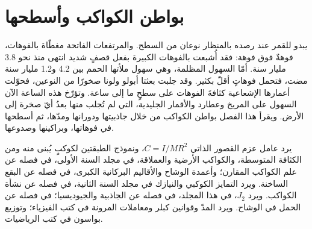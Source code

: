 \chapter{بواطن الكواكب وأسطحها}\label{ch:b3:planetary-interiors-surfaces}

يبدو للقمر عند رصده بالمنظار نوعان من السطح. والمرتفعات الفاتحة
مغطّاة بالفوهات، فوهةٌ فوق فوهة: فقد أُشبعت
بالفوهات الكبيرة بفعل قصفٍ شديد انتهى منذ نحو 3.8 مليار
سنة. أمّا السهول المظلمة، وهي سهول ملأتها الحمم بين 4.2 و1.2 مليار
سنة مضت، فتحمل فوهاتٍ أقلّ بكثير. وقد جلبت بعثتا أبولو ولونا
صخورًا من النوعين، فحوّلت أعمارها الإشعاعية
كثافةَ الفوهات على سطحٍ ما إلى ساعة. وتؤرّخ هذه الساعة الآن
السهول على المريخ وعطارد والأقمار الجليدية، التي لم تُجلب منها بعدُ أيّ صخرة
إلى الأرض. ويقرأ هذا الفصل بواطن الكواكب من خلال
جاذبيتها ودورانها ومدّها، ثم أسطحها في فوهاتها،
وبراكينها وصدوعها.

\begin{recall}
يرد عامل عزم القصور الذاتي $C = I/MR^2$، ونموذج الطبقتين لكوكبٍ
يُبنى منه ومن الكثافة المتوسطة، والكواكب الأرضية والعملاقة، في مجلد
السنة الأولى، في فصله عن علم الكواكب المقارن؛ وأعمدة الوشاح
والأقاليم البركانية الكبرى، في فصله عن
البقع الساخنة. ويرد التمايز الكوكبي والنيازك في مجلد السنة الثانية،
في فصله عن نشأة الكواكب. ويرد  $J_2$،
  في هذا المجلد، في فصله عن
الجاذبية والجيوديسيا؛  في فصله عن الحمل في الوشاح.
ويرد المدّ وقوانين كبلر ومعاملات المرونة في كتب الفيزياء؛
وتوزيع بواسون في
كتب الرياضيات.
\end{recall}

